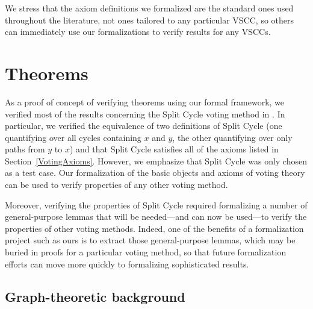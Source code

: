 \documentclass[runningheads]{llncs}
\begin{document}
We stress that the axiom definitions we formalized are the standard ones used throughout the literature, not ones tailored to any particular VSCC, so others can immediately use our formalizations to verify results for any VSCCs.

\section{Theorems}\label{Theorems}

As a proof of concept of verifying theorems using our formal framework, we verified most of the results concerning the Split Cycle voting method in \cite{HP2020b}. In particular, we verified the equivalence of two definitions of Split Cycle (one quantifying over all cycles containing $x$ and $y$, the other quantifying over only paths from $y$ to $x$) and that Split Cycle satisfies all of the axioms listed in Section~\ref{VotingAxioms}. However, we emphasize that Split Cycle was only chosen as a test case. Our formalization of the basic objects and axioms of voting theory can be used to verify properties of any other voting method. 

Moreover, verifying the properties of Split Cycle required formalizing a number of general-purpose lemmas that will be needed---and can now be used---to verify the properties of other voting methods. Indeed, one of the benefits of a formalization project such as ours is to extract those general-purpose lemmas, which may be buried in proofs for a particular voting method, so that future formalization efforts can move more quickly to formalizing sophisticated results.

\subsection{Graph-theoretic background}
\end{document}
